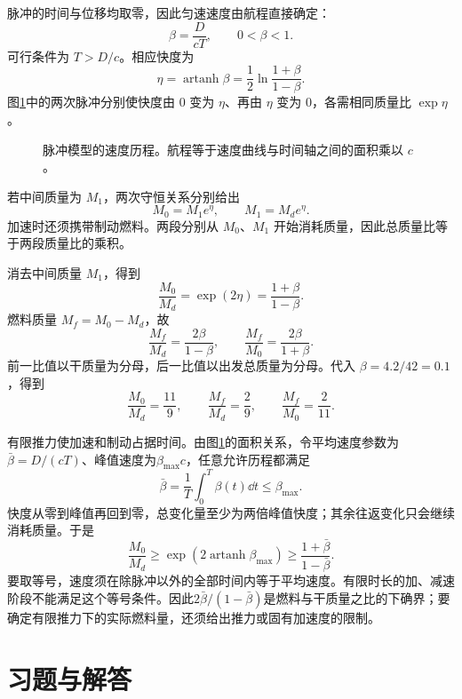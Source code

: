 \begin{solution}
脉冲的时间与位移均取零，因此匀速速度由航程直接确定：
\[
\beta=\frac D{cT},\qquad 0<\beta<1.
\]
可行条件为 $T>D/c$。相应快度为
\[
\eta=\operatorname{artanh}\beta
=\frac12\ln\frac{1+\beta}{1-\beta}.
\]
图\ref{deep3:fig:d3-e10-s}中的两次脉冲分别使快度由 $0$ 变为 $\eta$、再由 $\eta$ 变为 $0$，各需相同质量比 $\exp\eta$。
\begin{figure}[H]\centering
{}
\caption{脉冲模型的速度历程。航程等于速度曲线与时间轴之间的面积乘以 $c$。}\label{deep3:fig:d3-e10-s}
\end{figure}
若中间质量为 $M_1$，两次守恒关系分别给出
\[
M_0=M_1e^\eta,\qquad M_1=M_de^\eta.
\]
加速时还须携带制动燃料。两段分别从 $M_0$、$M_1$ 开始消耗质量，因此总质量比等于两段质量比的乘积。

消去中间质量 $M_1$，得到
\[
\frac{M_0}{M_d}=\exp(2\eta)=\frac{1+\beta}{1-\beta}.
\]
燃料质量 $M_f=M_0-M_d$，故
\[
\frac{M_f}{M_d}=\frac{2\beta}{1-\beta},\qquad
\frac{M_f}{M_0}=\frac{2\beta}{1+\beta}.
\]
前一比值以干质量为分母，后一比值以出发总质量为分母。代入 $\beta=4.2/42=0.1$，得到
\[
\frac{M_0}{M_d}=\frac{11}9,\qquad
\frac{M_f}{M_d}=\frac29,\qquad
\frac{M_f}{M_0}=\frac2{11}.
\]

有限推力使加速和制动占据时间。由图\ref{deep3:fig:d3-e10-s}的面积关系，令平均速度参数为$\bar\beta=D/(cT)$、峰值速度为$\beta_{\max}c$，任意允许历程都满足
\[
\bar\beta=\frac1T\int_0^T\beta(t)\dd t\le\beta_{\max}.
\]
快度从零到峰值再回到零，总变化量至少为两倍峰值快度；其余往返变化只会继续消耗质量。于是
\[
\frac{M_0}{M_d}\ge
\exp\!\left(2\operatorname{artanh}\beta_{\max}\right)
\ge\frac{1+\bar\beta}{1-\bar\beta}.
\]
要取等号，速度须在除脉冲以外的全部时间内等于平均速度。有限时长的加、减速阶段不能满足这个等号条件。因此$2\bar\beta/(1-\bar\beta)$是燃料与干质量之比的下确界；要确定有限推力下的实际燃料量，还须给出推力或固有加速度的限制。

\end{solution}




\section{习题与解答}

